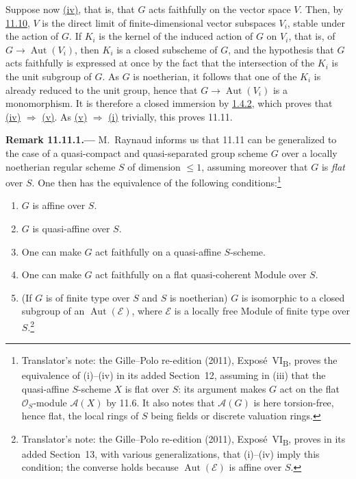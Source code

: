 Suppose now \hyperref[concl:sga3-VIB-11.11-iv]{\textup{(iv)}},
that is, that \(G\) acts faithfully on the vector space \(V\).
Then, by \hyperref[cor:sga3-VIB-11.10]{11.10}, \(V\) is the
direct limit of finite-dimensional vector subspaces \(V_i\),
stable under the action of \(G\). If \(K_i\) is the kernel of
the induced action of \(G\) on \(V_i\), that is, of
\(G\to\operatorname{Aut}(V_i)\), then \(K_i\) is a closed
subscheme of \(G\), and the hypothesis that \(G\) acts
faithfully is expressed at once by the fact that the
intersection of the \(K_i\) is the unit subgroup of \(G\). As
\(G\) is noetherian, it follows that one of the \(K_i\) is
already reduced to the unit group, hence that
\(G\to\operatorname{Aut}(V_i)\) is a monomorphism. It is
therefore a closed immersion by
\hyperref[cor:sga3-VIB-1.4.2]{1.4.2}, which proves that
\hyperref[concl:sga3-VIB-11.11-iv]{\textup{(iv)}}
\(\Rightarrow\)
\hyperref[concl:sga3-VIB-11.11-v]{\textup{(v)}}. As
\hyperref[concl:sga3-VIB-11.11-v]{\textup{(v)}}
\(\Rightarrow\)
\hyperref[concl:sga3-VIB-11.11-i]{\textup{(i)}} trivially, this
proves 11.11.

\medskip
{}\label{rem:sga3-VIB-11.11.1}%
\noindent\textbf{Remark 11.11.1.---}
M.~Raynaud informs us that 11.11 can be generalized to the
case of a quasi-compact and quasi-separated group scheme \(G\)
over a locally noetherian regular scheme \(S\) of dimension
\(\leq1\), assuming moreover that \(G\) is \emph{flat} over
\(S\). One then has the equivalence of the following
conditions:\footnote{Translator's note: the Gille--Polo re-edition (2011), Expos\'e~VI\textsubscript{B}, proves the
equivalence of (i)--(iv) in its added Section~12, assuming in (iii) that the quasi-affine \(S\)-scheme \(X\) is flat
over \(S\): its argument makes \(G\) act on the flat \(\mathcal O_S\)-module \(\mathcal A(X)\) by 11.6. It also notes
that \(\mathcal A(G)\) is here torsion-free, hence flat, the local rings of \(S\) being fields or discrete valuation
rings.}
\begin{enumerate}
\item[\textup{(i)}] \(G\) is affine over \(S\).
\item[\textup{(ii)}] \(G\) is quasi-affine over \(S\).
\item[\textup{(iii)}] One can make \(G\) act faithfully on a
  quasi-affine \(S\)-scheme.
\item[\textup{(iv)}] One can make \(G\) act faithfully on a
  flat quasi-coherent Module over \(S\).
\item[\textup{(v)}]\label{concl:sga3-VIB-11.11.1-b}
  \textup{(}If \(G\) is of finite type over \(S\) and \(S\) is
  noetherian\textup{)} \(G\) is isomorphic to a closed subgroup
  of an \(\operatorname{Aut}(\mathcal E)\), where \(\mathcal E\)
  is a locally free Module of finite type over \(S\).\footnote{Translator's note: the Gille--Polo re-edition (2011),
  Expos\'e~VI\textsubscript{B}, proves in its added Section~13, with various generalizations, that (i)--(iv) imply
  this condition; the converse holds because \(\operatorname{Aut}(\mathcal E)\) is affine over \(S\).}
\end{enumerate}

